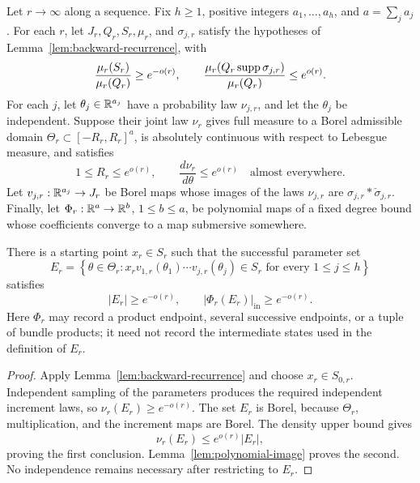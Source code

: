 \begin{corollary}
\label{cor:restricted-products}
Let $r\to\infty$ along a sequence.  Fix $h\ge1$, positive
integers $a_1,\ldots,a_h$, and $a=\sum_j a_j$.
For each $r$, let $J_r,Q_r,S_r,\mu_r$, and
$\sigma_{j,r}$ satisfy the hypotheses of
Lemma~\ref{lem:backward-recurrence}, with
\[
 \frac{\mu_r(S_r)}{\mu_r(Q_r)}\ge e^{-o(r)},\qquad
 \frac{\mu_r(Q_r\operatorname{supp}\sigma_{j,r})}{\mu_r(Q_r)}
       \le e^{o(r)}.
\]
For each $j$, let $\theta_j\in\mathbb R^{a_j}$ have a probability law
$\nu_{j,r}$, and let the $\theta_j$ be independent.  Suppose their
joint law $\nu_r$ gives full measure to a Borel admissible domain
$\Theta_r\subset[-R_r,R_r]^a$, is absolutely
continuous with respect to Lebesgue measure, and satisfies
\[
 1\le R_r\le e^{o(r)},\qquad
 \frac{d\nu_r}{d\theta}\le e^{o(r)}
       \quad\text{almost everywhere}.
\]
Let $v_{j,r}:\mathbb R^{a_j}\to J_r$ be Borel maps whose images of the
laws $\nu_{j,r}$ are $\sigma_{j,r}*\check\sigma_{j,r}$.
Finally, let $\Phi_r:\mathbb R^a\to\mathbb R^b$, $1\le b\le a$, be polynomial
maps of a fixed degree bound whose coefficients converge to a map
submersive somewhere.

There is a starting point $x_r\in S_r$ such that the successful
parameter set
\[
 E_r=\left\{\theta\in\Theta_r:
 x_r v_{1,r}(\theta_1)\cdots v_{j,r}(\theta_j)\in S_r
 \text{ for every }1\le j\le h\right\}
\]
satisfies
\[
 |E_r|\ge e^{-o(r)},\qquad
 |\Phi_r(E_r)|_{\mathrm{in}}\ge e^{-o(r)}.
\]
Here $\Phi_r$ may record a product endpoint, several successive
endpoints, or a tuple of bundle products; it need not record the
intermediate states used in the definition of $E_r$.
\end{corollary}

\begin{proof}
Apply Lemma~\ref{lem:backward-recurrence} and choose
$x_r\in S_{0,r}$.  Independent sampling of the parameters produces
the required independent increment laws, so $\nu_r(E_r)\ge
e^{-o(r)}$.  The set $E_r$ is Borel, because $\Theta_r$, multiplication, and the
increment maps are Borel.  The density upper bound gives
\[
 \nu_r(E_r)\le e^{o(r)}|E_r|,
\]
proving the first conclusion.  Lemma~\ref{lem:polynomial-image}
proves the second.  No independence remains necessary after
restricting to $E_r$.
\end{proof}

